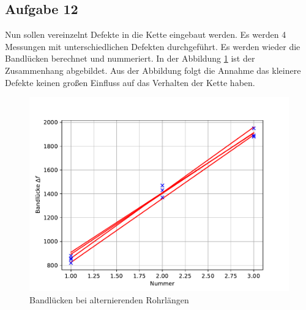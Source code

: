 \subsection{Aufgabe 12}
Nun sollen vereinzelnt Defekte in die Kette eingebaut werden.
Es werden 4 Messungen mit unterschiedlichen Defekten durchgeführt.
Es werden wieder die Bandlücken berechnet und nummeriert.
In der Abbildung \ref{fig.Aufgabe12} ist der Zusammenhang abgebildet.
Aus der Abbildung folgt die Annahme das kleinere Defekte keinen großen Einfluss auf das Verhalten der Kette haben.
  \begin{figure}[h!]
    \centering
    \includegraphics[width=\textwidth]{A12.pdf}
    \caption{Bandlücken bei alternierenden Rohrlängen}
    \label{fig.Aufgabe12}
  \end{figure}
  \FloatBarrier
